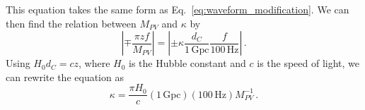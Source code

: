 \documentclass[aps,prd,twocolumn,superscriptaddress,preprintnumbers,floatfix,nofootinbib]{revtex4-2}
\begin{document}
This equation takes the same form as Eq.~\eqref{eq:waveform_modification}.
We can then find the relation between $M_{PV}$ and $\kappa$ by
\begin{equation}
    \left|\mp\frac{\pi zf}{M_{PV}}\right|=\left|\pm\kappa\frac{d_C}{1\,\mathrm{Gpc}}\frac{f}{100\,\mathrm{Hz}}\right|\,.
\end{equation}
Using $H_0d_C=cz$, where $H_0$ is the Hubble constant and $c$ is the speed of light, we can rewrite the equation as
\begin{equation}
    \kappa=\frac{\pi H_0}{c}\left(1\,\mathrm{Gpc}\right)\left(100\,\mathrm{Hz}\right)M_{PV}^{-1}\,.
\end{equation}


\end{document}
